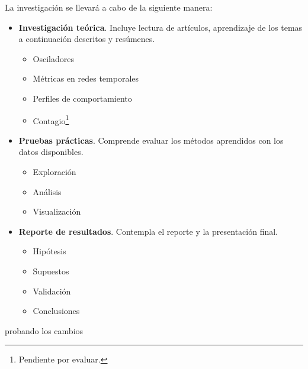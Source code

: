 \documentclass[10pt]{article}
\begin{document}
La investigación se llevará a cabo de la siguiente manera:

\begin{itemize}
 \item {\bf Investigación teórica}. Incluye lectura de artículos, aprendizaje
  de los temas a continuación descritos y resúmenes.
  \begin{itemize}
   \item Osciladores
   \item Métricas en redes temporales
   \item Perfiles de comportamiento 
   \item Contagio\footnote{Pendiente por evaluar.}
  \end{itemize}
 \item {\bf Pruebas prácticas}. Comprende evaluar los métodos aprendidos con
 los datos disponibles.
  \begin{itemize}
   \item Exploración
   \item Análisis
   \item Visualización
  \end{itemize}
 \item {\bf Reporte de resultados}. Contempla el reporte y la presentación final.
  \begin{itemize}
   \item Hipótesis
   \item Supuestos
   \item Validación
   \item Conclusiones
  \end{itemize}
\end{itemize}


 probando los cambios



% 
% 
\end{document}
